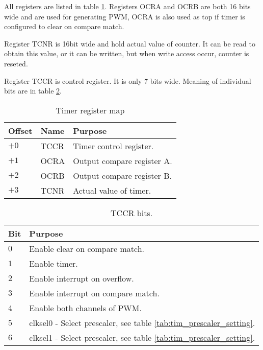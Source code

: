 All registers are listed in table \ref{tab:tim_reg_map}. Registers OCRA and OCRB
are both 16 bits wide and are used for generating PWM, OCRA is also used as top
if timer is configured to clear on compare match.

Register TCNR is 16bit wide and hold actual value of counter. It can be read to
obtain this value, or it can be written, but when write access occur, counter is
reseted.

Register TCCR is control register. It is only 7 bits wide. Meaning of individual
bits are in table \ref{tab:tim_tccr_bits}.

\begin{table}[h]
    \centering
    \begin{tabular}{|l|l|l|}
        \hline
        \textbf{Offset} & \textbf{Name} & \textbf{Purpose}           \\ \hline
        $+0$            & TCCR          & Timer control register.    \\ \hline
        $+1$            & OCRA          & Output compare register A. \\ \hline
        $+2$            & OCRB          & Output compare register B. \\ \hline
        $+3$            & TCNR          & Actual value of timer.     \\ \hline
    \end{tabular}
    \caption{Timer register map}
    \label{tab:tim_reg_map}
\end{table}

\begin{table}[h]
    \centering
    \begin{tabular}{|l|l|}
        \hline
        \textbf{Bit} & \textbf{Purpose}                                                         \\ \hline
        $0$          & Enable clear on compare match.                                           \\ \hline
        $1$          & Enable timer.                                                            \\ \hline
        $2$          & Enable interrupt on overflow.                                            \\ \hline
        $3$          & Enable interrupt on compare match.                                       \\ \hline
        $4$          & Enable both channels of PWM.                                             \\ \hline
        $5$          & clksel0 - Select prescaler, see table \ref{tab:tim_prescaler_setting}.   \\ \hline
        $6$          & clksel1 - Select prescaler, see table \ref{tab:tim_prescaler_setting}.   \\ \hline
    \end{tabular}
    \caption{TCCR bits.}
    \label{tab:tim_tccr_bits}
\end{table}

